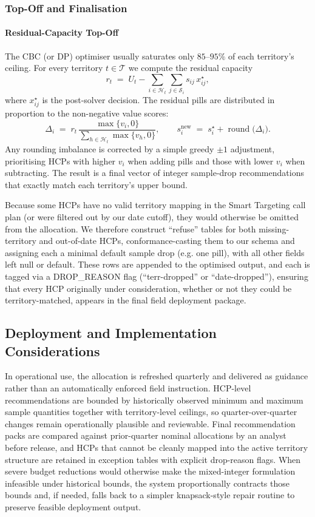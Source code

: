 \subsubsection{Top-Off and Finalisation}
\label{sec:topoff}

\paragraph{Residual-Capacity Top-Off}

The CBC (or DP) optimiser usually saturates only \(85\text{--}95\%\) of each territory's ceiling. For every territory \(t\in\mathcal T\) we compute the residual capacity
\[
  r_t \;=\;
    U_t -
    \sum_{i\in\mathcal H_t}
      \sum_{j\in\mathcal S_i}
        s_{ij}\,x_{ij}^{\star},
\]
where \(x_{ij}^{\star}\) is the post-solver decision. The residual pills are distributed in proportion to the non-negative value scores:
\[
  \Delta_i
  \;=\;
  r_t\,
  \frac{\max\{v_i,0\}}
       {\sum_{h\in\mathcal H_t}\max\{v_h,0\}},
  \qquad
  s_i^{\mathrm{new}}
    \;=\;
    s_i^{\star} + \operatorname{round}\!\bigl(\Delta_i\bigr).
\]
Any rounding imbalance is corrected by a simple greedy \(\pm1\) adjustment, prioritising HCPs with higher \(v_i\) when adding pills and those with lower \(v_i\) when subtracting. The result is a final vector of integer sample-drop recommendations that exactly match each territory's upper bound.

Because some HCPs have no valid territory mapping in the Smart Targeting call plan (or were filtered out by our date cutoff), they would otherwise be omitted from the allocation. We therefore construct ``refuse'' tables for both missing-territory and out-of-date HCPs, conformance-casting them to our schema and assigning each a minimal default sample drop (e.g. one pill), with all other fields left null or default. These rows are appended to the optimised output, and each is tagged via a DROP\_REASON flag (``terr-dropped'' or ``date-dropped''), ensuring that every HCP originally under consideration, whether or not they could be territory-matched, appears in the final field deployment package.

\subsection{Deployment and Implementation Considerations}

In operational use, the allocation is refreshed quarterly and delivered as guidance rather than an automatically enforced field instruction. HCP-level recommendations are bounded by historically observed minimum and maximum sample quantities together with territory-level ceilings, so quarter-over-quarter changes remain operationally plausible and reviewable. Final recommendation packs are compared against prior-quarter nominal allocations by an analyst before release, and HCPs that cannot be cleanly mapped into the active territory structure are retained in exception tables with explicit drop-reason flags. When severe budget reductions would otherwise make the mixed-integer formulation infeasible under historical bounds, the system proportionally contracts those bounds and, if needed, falls back to a simpler knapsack-style repair routine to preserve feasible deployment output.

